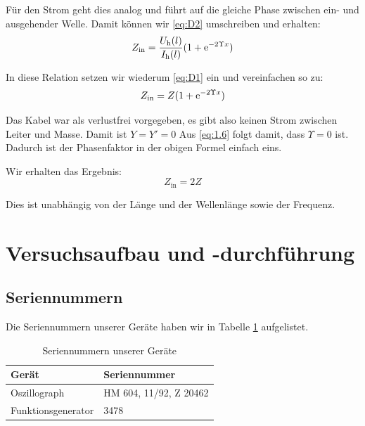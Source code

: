 Für den Strom geht dies analog und führt auf die gleiche Phase zwischen ein-
und ausgehender Welle. Damit können wir \eqref{eq:D2} umschreiben und erhalten:
\[
	Z_\text{in}
	= \frac{U_\text h (l)}{I_\text h (l)} (1 + \mathrm e^{-2 \Upsilon x})
\]

In diese Relation setzen wir wiederum \eqref{eq:D1} ein und vereinfachen so zu:
\[
	Z_\text{in}
	= Z (1 + \mathrm e^{-2 \Upsilon x})
\]

Das Kabel war als verlustfrei vorgegeben, es gibt also keinen Strom zwischen
Leiter und Masse. Damit ist $Y = Y' = 0$ Aus \eqref{eq:1.6} folgt damit, dass
$\Upsilon = 0$ ist. Dadurch ist der Phasenfaktor in der obigen Formel einfach
eins.

Wir erhalten das Ergebnis:
\[
	Z_\text{in} = 2 Z
\]

Dies ist unabhängig von der Länge und der Wellenlänge sowie der Frequenz.


\section{Versuchsaufbau und -durchführung}

\subsection{Seriennummern}

Die Seriennummern unserer Geräte haben wir in Tabelle \ref{tb:seriennummern}
aufgelistet.

\begin{table}[hb]
	\center
	\begin{tabular}{ll}
		Gerät & Seriennummer \\
		\hline
		Oszillograph & HM 604, 11/92, Z 20462 \\
		Funktionsgenerator & 3478 \\
	\end{tabular}
	\caption{Seriennummern unserer Geräte}
	\label{tb:seriennummern}
\end{table}

